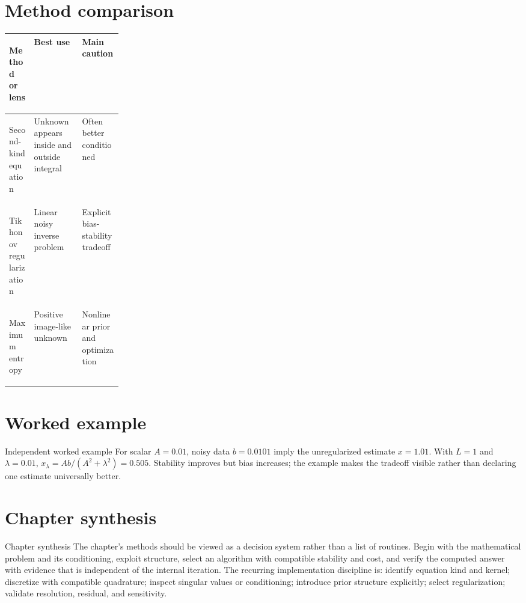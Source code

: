 \documentclass[10pt,letterpaper]{article}
\begin{document}
\section*{Method comparison}
\begin{center}
\small
\begin{tabularx}{\linewidth}{>{\bfseries\raggedright\arraybackslash}p{0.22\linewidth}XX}
\toprule
Method or lens & Best use & Main caution \\
\midrule
Second-kind equation & Unknown appears inside and outside integral & Often better conditioned \\
Tikhonov regularization & Linear noisy inverse problem & Explicit bias-stability tradeoff \\
Maximum entropy & Positive image-like unknown & Nonlinear prior and optimization \\
\bottomrule
\end{tabularx}
\end{center}

\section*{Worked example}
\begin{exambox}{Independent worked example}
For scalar $A=0.01$, noisy data $b=0.0101$ imply the unregularized estimate $x=1.01$.  With $L=1$ and $\lambda=0.01$, $x_\lambda=Ab/(A^2+\lambda^2)=0.505$.  Stability improves but bias increases; the example makes the tradeoff visible rather than declaring one estimate universally better.
\end{exambox}

\section*{Chapter synthesis}
\begin{summarybox}{Chapter synthesis}
The chapter's methods should be viewed as a decision system rather than a list of routines.  Begin with the mathematical problem and its conditioning, exploit structure, select an algorithm with compatible stability and cost, and verify the computed answer with evidence that is independent of the internal iteration.  The recurring implementation discipline is: identify equation kind and kernel; discretize with compatible quadrature; inspect singular values or conditioning; introduce prior structure explicitly; select regularization; validate resolution, residual, and sensitivity.
\end{summarybox}
\end{document}
